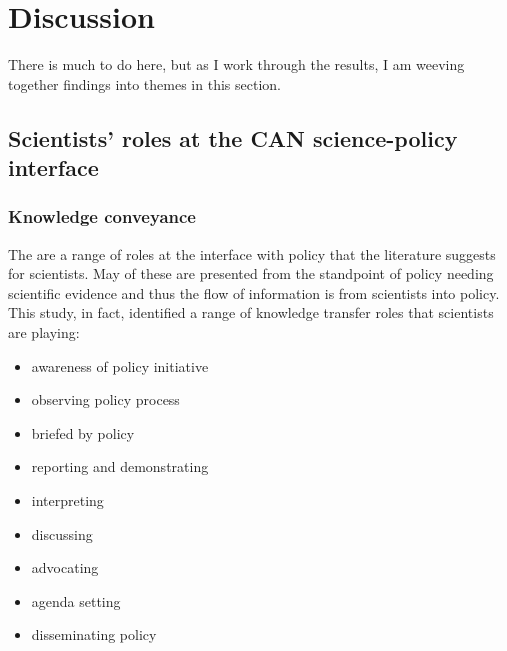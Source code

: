\chapter{Discussion}\label{ch:discussion}

There is much to do here, but as I work through the results, I am weeving together findings into themes in this section.

\section{Scientists' roles at the CAN science-policy interface}\label{sec:disroles}

\subsection{Knowledge conveyance}\label{sec:disknowrole}
The are a range of roles at the interface with policy that the literature suggests for scientists. May of these are presented from the standpoint of policy needing scientific evidence and thus the flow of information is from scientists into policy. This study, in fact, identified a range of knowledge transfer roles that scientists are playing:
\begin{itemize}
    \item awareness of policy initiative
    \item observing policy process
    \item briefed by policy
    \item reporting and demonstrating
    \item interpreting
    \item discussing
    \item advocating
    \item agenda setting
    \item disseminating policy
\end{itemize}

